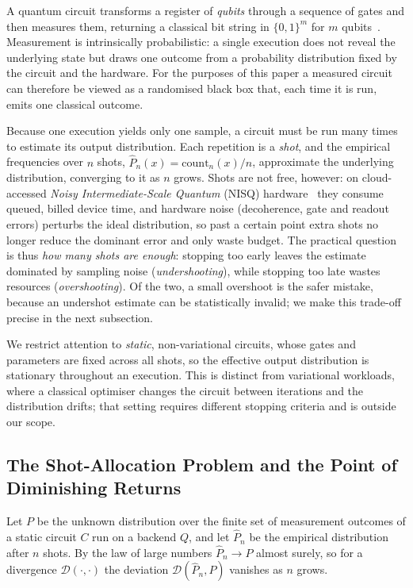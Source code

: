 \documentclass[runningheads]{llncs}
\begin{document}
A quantum circuit transforms a register of \emph{qubits} through a sequence of
gates and then measures them, returning a classical bit string in $\{0,1\}^m$
for $m$ qubits~\cite{nielsen2010quantum}. Measurement is intrinsically
probabilistic: a single execution does not reveal the underlying state but draws
one outcome from a probability distribution fixed by the circuit and the
hardware. For the purposes of this paper a measured circuit can therefore be
viewed as a randomised black box that, each time it is run, emits one classical
outcome.

Because one execution yields only one sample, a circuit must be run many times
to estimate its output distribution. Each repetition is a \emph{shot}, and the
empirical frequencies over $n$ shots, $\hat{P}_n(x)=\mathrm{count}_n(x)/n$,
approximate the underlying distribution, converging to it as $n$ grows. Shots
are not free, however: on cloud-accessed \emph{Noisy Intermediate-Scale Quantum}
(NISQ) hardware~\cite{preskill2018nisq} they consume queued, billed device time,
and hardware noise (decoherence, gate and readout errors) perturbs the ideal
distribution, so past a certain point extra shots no longer reduce the dominant
error and only waste budget. The practical question is thus \emph{how many shots
are enough}: stopping too early leaves the estimate dominated by sampling noise
(\emph{undershooting}), while stopping too late wastes resources
(\emph{overshooting}). Of the two, a small overshoot is the safer mistake,
because an undershot estimate can be statistically invalid; we make this
trade-off precise in the next subsection.

We restrict attention to \emph{static}, non-variational circuits, whose gates
and parameters are fixed across all shots, so the effective output distribution
is stationary throughout an execution. This is distinct from variational
workloads, where a classical optimiser changes the circuit between iterations
and the distribution drifts; that setting requires different stopping criteria
and is outside our scope.

\subsection{The Shot-Allocation Problem and the Point of Diminishing Returns}

Let $P$ be the unknown distribution over the finite set of measurement outcomes
of a static circuit $C$ run on a backend $Q$, and let $\hat{P}_n$ be the
empirical distribution after $n$ shots. By the law of large numbers
$\hat{P}_n \to P$ almost surely, so for a divergence $\mathcal{D}(\cdot,\cdot)$
the deviation $\mathcal{D}(\hat{P}_n, P)$ vanishes as $n$ grows.
\end{document}
